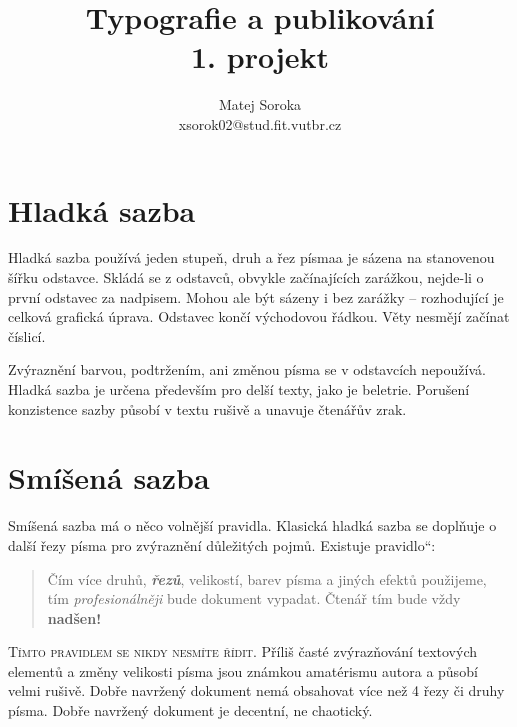\documentclass[czech,a4paper,10pt,twocolumn]{article}
\newcommand{\myquotes}[1]{\quotedblbase#1\textquotedblleft}
\begin{document}
\title{Typografie a publikování\\{\large 1. projekt}}
\author{Matej Soroka\\xsorok02@stud.fit.vutbr.cz}
\date{}

\maketitle

\section{Hladká sazba}
\label{sec:smooth}

Hladká sazba používá jeden stupeň, druh a řez písma\linebreak a je sázena na stanovenou šířku odstavce. Skládá se z odstavců, obvykle začínajících zarážkou, nejde-li o první odstavec za nadpisem. Mohou ale být sázeny i bez zarážky -- rozhodující je celková grafická úprava. Odstavec končí východovou řádkou. Věty nesmějí začínat číslicí.

Zvýraznění barvou, podtržením, ani změnou písma se v odstavcích nepoužívá. Hladká sazba je určena především pro delší texty, jako je beletrie. Porušení konzistence sazby působí v textu rušivě a unavuje čtenářův zrak.

\section{Smíšená sazba}\label{2}
\label{sec:mixed}

Smíšená sazba má o něco volnější pravidla. Klasická hladká sazba se doplňuje o další řezy písma pro zvýraznění důležitých pojmů. Existuje \myquotes{pravidlo}:

\begin{quotation}

    Čím více {\ttfamily druhů}, {\bfseries{\itshape řezů}}, velikostí, barev písma a jiných efektů použijeme, tím \emph{profesionálněji} bude dokument vypadat. Čtenář tím {\tiny bude} vždy {\bfseries{\huge nadšen!}}

\end{quotation}

{\scshape Tímto pravidlem se nikdy nesmíte řídit}. Příliš časté zvýrazňování textových elementů a změny velikosti písma jsou známkou amatérismu autora a působí velmi rušivě. Dobře navržený dokument nemá obsahovat více než
4 řezy či druhy písma. Dobře navržený dokument je decentní, ne chaotický.
\end{document}
